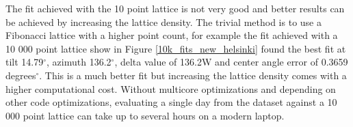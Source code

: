 \begin{figure}[h]
\begin{floatrow}
\end{floatrow}
\end{figure}

\noindent The fit achieved with the 10 point lattice is not very good and better results can be achieved by increasing the lattice density. The trivial method is to use a Fibonacci lattice with a higher point count, for example the fit achieved with a 10 000 point lattice show in Figure \ref{10k_fits_new_helsinki} found the best fit at tilt 14.79$^\circ$, azimuth 136.2$^\circ$, delta value of 136.2W and center angle error of 0.3659 degrees$^\circ$. This is a much better fit but increasing the lattice density comes with a higher computational cost. Without multicore optimizations and depending on other code optimizations, evaluating a single day from the dataset against a 10 000 point lattice can take up to several hours on a modern laptop.

